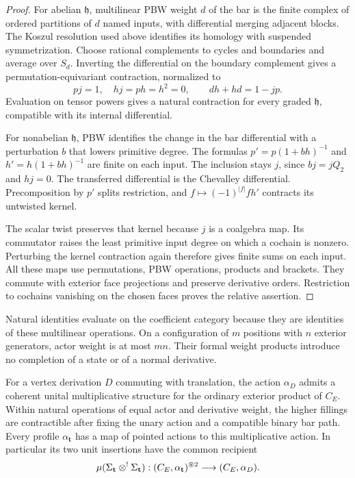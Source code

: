 \begin{proof}
For abelian $\mathfrak h$, multilinear PBW weight $d$ of the bar
is the finite complex of ordered partitions of $d$ named inputs,
with differential merging adjacent blocks. The Koszul resolution
used above identifies its homology with suspended symmetrization.
Choose rational complements to cycles and boundaries and average
over $S_d$. Inverting the differential on the boundary complement
gives a permutation-equivariant contraction, normalized to
\[
 pj=1,\quad hj=ph=h^2=0,\qquad dh+hd=1-jp.
\]
Evaluation on tensor powers gives a natural contraction for every
graded $\mathfrak h$, compatible with its internal differential.

For nonabelian $\mathfrak h$, PBW identifies the change in the
bar differential with a perturbation $b$ that lowers primitive
degree. The formulas
$p'=p(1+bh)^{-1}$ and $h'=h(1+bh)^{-1}$ are finite on each
input. The inclusion stays $j$, since $bj=jQ_2$ and $hj=0$.
The transferred differential is the Chevalley differential.
Precomposition by $p'$ splits restriction, and
$f\mapsto(-1)^{|f|}fh'$ contracts its untwisted kernel.

The scalar twist preserves that kernel because $j$ is a
coalgebra map. Its commutator raises the least primitive input
degree on which a cochain is nonzero. Perturbing the kernel
contraction again therefore gives finite sums on each input.
All these maps use permutations, PBW operations, products and
brackets. They commute with exterior face projections and
preserve derivative orders. Restriction to cochains vanishing
on the chosen faces proves the relative assertion.
\end{proof}

Natural identities evaluate on the coefficient category because
they are identities of these multilinear operations. On a
configuration of $m$ positions with $n$ exterior generators,
actor weight is at most $mn$. Their formal weight products
introduce no completion of a state or of a normal derivative.

\begin{theorem}\label{thm:vol2-derivation-multiplicative}
For a vertex derivation $D$ commuting with translation, the
action $\alpha_D$ admits a coherent unital multiplicative
structure for the ordinary exterior product of $C_E$.
Within natural operations of equal actor and derivative weight,
the higher fillings are contractible after fixing the unary
action and a compatible binary bar path.
Every profile $\alpha_{\mathbf t}$ has a map of pointed actions
to this multiplicative action. In particular its two unit
insertions have the common recipient
\begin{equation}\label{eq:vol2-profile-recipient}
 \mu(\Sigma_{\mathbf t}\mathbin{\otimes^!}\Sigma_{\mathbf t}):
 (C_E,\alpha_{\mathbf t})^{\circledast2}
                         \longrightarrow(C_E,\alpha_D).
\end{equation}
\end{theorem}

